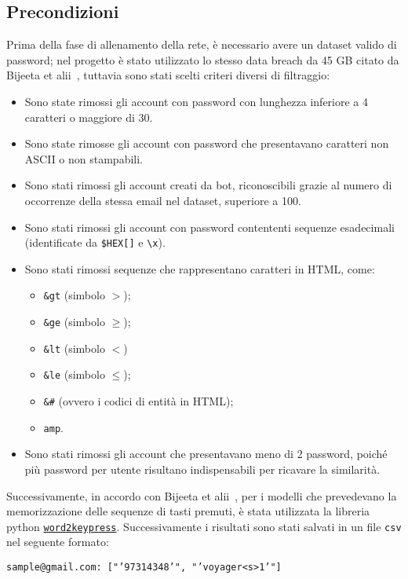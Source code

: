 \subsection{Precondizioni}
Prima della fase di allenamento della rete, è necessario avere un dataset valido di password; nel progetto è stato utilizzato lo stesso data breach da 45 GB citato da Bijeeta et alii~\cite{biijeta}, tuttavia sono stati scelti criteri diversi di filtraggio:
\begin{itemize}
    \item Sono state rimossi gli account con password con lunghezza inferiore a 4 caratteri o maggiore di 30.
    \item Sono state rimosse gli account con password che presentavano caratteri non ASCII o non stampabili.
    \item Sono stati rimossi gli account creati da bot, riconoscibili grazie al numero di occorrenze della stessa email nel dataset, superiore a 100.
    \item Sono stati rimossi gli account con password contententi sequenze esadecimali (identificate da \texttt{\$HEX[]} e \texttt{\textbackslash x}).
    \item Sono stati rimossi sequenze che rappresentano caratteri in HTML, come:
    \begin{itemize}
        \item \texttt{\&gt} (simbolo $>$);
        \item \texttt{\&ge} (simbolo $\geq$);
        \item \texttt{\&lt} (simbolo $<$)
        \item \texttt{\&le} (simbolo $\leq$);
        \item \texttt{\&\#} (ovvero i codici di entità in HTML);
        \item \texttt{amp}.
    \end{itemize}
    \item Sono stati rimossi gli account che presentavano meno di 2 password, poiché più password per utente risultano indispensabili per ricavare la similarità.
\end{itemize}
Successivamente, in accordo con Bijeeta et alii~\cite{biijeta}, per i modelli che prevedevano la memorizzazione delle sequenze di tasti premuti, è stata utilizzata la libreria python \href{https://github.com/rchatterjee/word2keypress}{\texttt{word2keypress}}.
Successivamente i risultati sono stati salvati in un file \texttt{csv} nel seguente formato:
\begin{center}
    \texttt{sample@gmail.com: ["'97314348'", "'voyager<s>1'"]}
\end{center}

